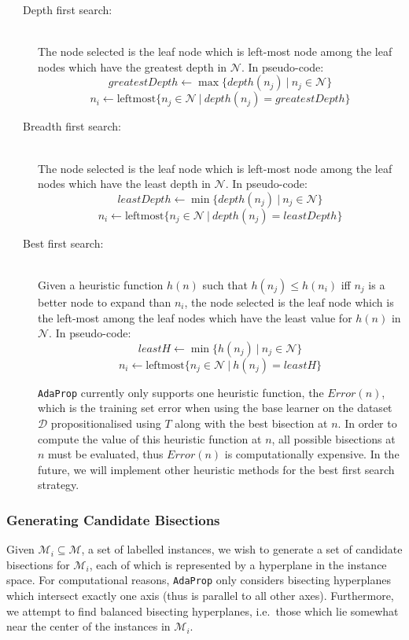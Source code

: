 \documentclass[a4paper,12pt]{article} %
\newcommand{\AdaProp}{\texttt{AdaProp}\xspace}
\newcommand{\mcl}[1]{\mathcal{#1}}
\begin{document}
\begin{description}
\item[~~~Depth first search:] \ \\
    The node selected is the leaf node 
    which is left-most node among 
    the leaf nodes which have the greatest depth
    in $\mcl{N}$.
    In pseudo-code:
    $$ greatestDepth \gets \max\{ depth(n_j) ~\big|~ n_j \in \mcl{N} \} $$
    $$ n_i \gets \textrm{leftmost}\{ n_j \in \mcl{N} ~\big|~ depth(n_j) = greatestDepth \} $$
        
\item[~~~Breadth first search:] \ \\
    The node selected is the leaf node 
    which is left-most node among 
    the leaf nodes which have the least depth
    in $\mcl{N}$.
    In pseudo-code:
    $$ leastDepth \gets \min\{ depth(n_j) ~\big|~ n_j \in \mcl{N} \} $$
    $$ n_i \gets \textrm{leftmost}\{ n_j \in \mcl{N} ~\big|~ depth(n_j) = leastDepth \} $$
    
\item[~~~Best first search:] \ \\
    Given a heuristic function $h(n)$ such that
    $h(n_j) \leq h(n_i)$ iff $n_j$ is a better node to expand than $n_i$,
    the node selected is the leaf node 
    which is the left-most among 
    the leaf nodes which have the least value for $h(n)$
    in $\mcl{N}$.
    In pseudo-code:
    $$ leastH \gets \min\{ h(n_j) ~\big|~ n_j \in \mcl{N} \} $$
    $$ n_i \gets \textrm{leftmost}\{ n_j \in \mcl{N} ~\big|~ h(n_j) = leastH \} $$

    \AdaProp currently only supports one heuristic function, 
        the $Error(n)$, which is the training set error 
        when using the base learner on the dataset $\mcl{D}$
        propositionalised using $T$ along with 
        the best bisection at $n$.
     In order to compute the value of this heuristic function at $n$,
         all possible bisections at $n$ must be evaluated,
         thus $Error(n)$ is computationally expensive.
     In the future, we will implement other heuristic methods
         for the best first search strategy.
    
\end{description}

\subsubsection{Generating Candidate Bisections}
\label{secCandGen}

Given $\mcl{M}_i \subseteq \mcl{M}$, 
    a set of labelled instances, 
    we wish to generate a set of candidate bisections for $\mcl{M}_i$,
    each of which is represented by a hyperplane in the instance space.
For computational reasons, 
    \AdaProp only considers bisecting hyperplanes 
    which intersect exactly one axis
    (thus is parallel to all other axes).
Furthermore, we attempt to find balanced bisecting hyperplanes, 
    i.e.\ those which lie somewhat near the center of the instances
    in $\mcl{M}_i$.
\end{document}
